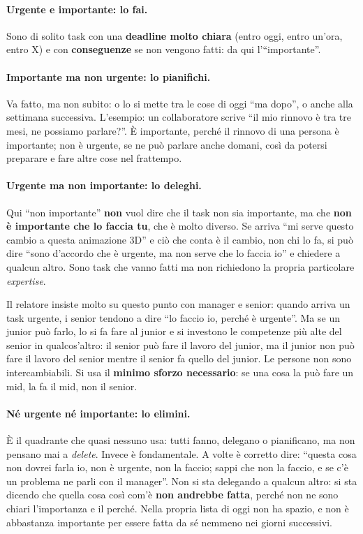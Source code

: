 \paragraph{Urgente e importante: lo fai.} Sono di solito task con una
\textbf{deadline molto chiara} (entro oggi, entro un'ora, entro X) e con
\textbf{conseguenze} se non vengono fatti: da qui l'``importante''.

\paragraph{Importante ma non urgente: lo pianifichi.} Va fatto, ma non subito:
o lo si mette tra le cose di oggi ``ma dopo'', o anche alla settimana successiva.
L'esempio: un collaboratore scrive ``il mio rinnovo è tra tre mesi, ne possiamo
parlare?''. È importante, perché il rinnovo di una persona è importante; non è
urgente, se ne può parlare anche domani, così da potersi preparare e fare altre
cose nel frattempo.

\paragraph{Urgente ma non importante: lo deleghi.} Qui ``non importante''
\textbf{non} vuol dire che il task non sia importante, ma che \textbf{non è
importante che lo faccia tu}, che è molto diverso. Se arriva ``mi serve questo
cambio a questa animazione 3D'' e ciò che conta è il cambio, non chi lo fa, si può
dire ``sono d'accordo che è urgente, ma non serve che lo faccia io'' e chiedere a
qualcun altro. Sono task che vanno fatti ma non richiedono la propria particolare
\emph{expertise}.

Il relatore insiste molto su questo punto con manager e senior: quando arriva un
task urgente, i senior tendono a dire ``lo faccio io, perché è urgente''. Ma se un
junior può farlo, lo si fa fare al junior e si investono le competenze più alte
del senior in qualcos'altro: il senior può fare il lavoro del junior, ma il
junior non può fare il lavoro del senior mentre il senior fa quello del junior.
Le persone non sono intercambiabili. Si usa il \textbf{minimo sforzo
necessario}: se una cosa la può fare un mid, la fa il mid, non il senior.

\paragraph{Né urgente né importante: lo elimini.} È il quadrante che quasi
nessuno usa: tutti fanno, delegano o pianificano, ma non pensano mai a
\emph{delete}. Invece è fondamentale. A volte è corretto dire: ``questa cosa non
dovrei farla io, non è urgente, non la faccio; sappi che non la faccio, e se c'è
un problema ne parli con il manager''. Non si sta delegando a qualcun altro: si
sta dicendo che quella cosa così com'è \textbf{non andrebbe fatta}, perché non
ne sono chiari l'importanza e il perché. Nella propria lista di oggi non ha
spazio, e non è abbastanza importante per essere fatta da sé nemmeno nei giorni
successivi.

